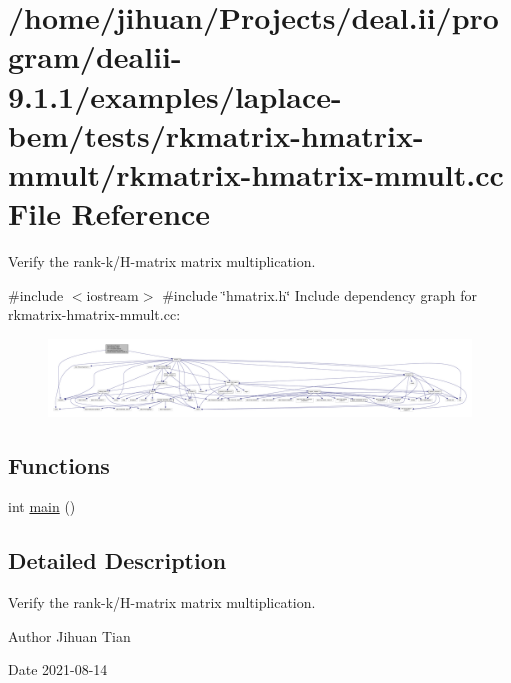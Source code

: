 \hypertarget{rkmatrix-hmatrix-mmult_8cc}{}\section{/home/jihuan/\+Projects/deal.ii/program/dealii-\/9.1.1/examples/laplace-\/bem/tests/rkmatrix-\/hmatrix-\/mmult/rkmatrix-\/hmatrix-\/mmult.cc File Reference}
\label{rkmatrix-hmatrix-mmult_8cc}


Verify the rank-\/k/\+H-\/matrix matrix multiplication.  


{\ttfamily \#include $<$iostream$>$}\newline
{\ttfamily \#include \char`\"{}hmatrix.\+h\char`\"{}}\newline
Include dependency graph for rkmatrix-\/hmatrix-\/mmult.cc\+:
\nopagebreak
\begin{figure}[H]
\begin{center}
\leavevmode
\includegraphics[width=350pt]{rkmatrix-hmatrix-mmult_8cc__incl}
\end{center}
\end{figure}
\subsection*{Functions}
\begin{DoxyCompactItemize}
\item 
int \hyperlink{rkmatrix-hmatrix-mmult_8cc_ae66f6b31b5ad750f1fe042a706a4e3d4}{main} ()
\end{DoxyCompactItemize}


\subsection{Detailed Description}
Verify the rank-\/k/\+H-\/matrix matrix multiplication. 

\begin{DoxyAuthor}{Author}
Jihuan Tian 
\end{DoxyAuthor}
\begin{DoxyDate}{Date}
2021-\/08-\/14 
\end{DoxyDate}


